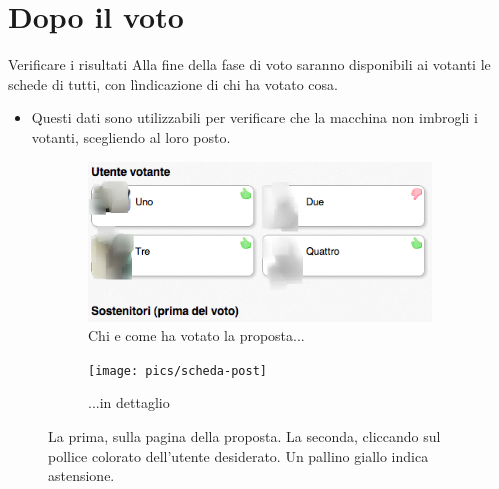 \documentclass[ignorenonframetext]{beamer}\usetheme{default}
\begin{document}
\section{Dopo il voto}
\begin{frame}{Verificare i risultati}
Alla fine della fase di voto saranno disponibili ai votanti le schede di tutti, con l\`indicazione di chi ha votato cosa.

\begin{itemize}\item Questi dati sono utilizzabili per verificare che la macchina non imbrogli i votanti, scegliendo al loro posto.\end{itemize}
\begin{figure}
	\begin{subfigure}[b]{.58\textwidth}
		\includegraphics[width=\textwidth,]{pics/voters}
		\caption{Chi e come ha votato la proposta...}
	\end{subfigure}
	\begin{subfigure}[b]{.34\textwidth}
		\texttt{[image: pics/scheda-post]}
		\caption{...in dettaglio}
	\end{subfigure}
\caption{La prima, sulla pagina della proposta. La seconda, cliccando sul pollice colorato dell'utente desiderato. Un pallino giallo indica astensione.}
\end{figure}
\end{frame}
\end{document}
